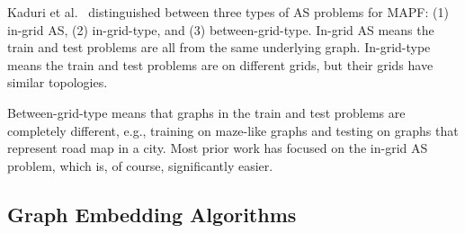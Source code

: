 \documentclass[letterpaper]{article} %
\newcommand{\Carmel}[1]{}
\newcommand{\Roni}[1]{}
\begin{document}


Kaduri et al.~\cite{kaduri2021experimental} distinguished between three types of AS problems for MAPF: 
(1) in-grid AS, (2) in-grid-type, and (3) between-grid-type. 
In-grid AS means the train and test problems are all from the same underlying graph. 
In-grid-type means the train and test problems are on different grids, but their grids have similar topologies. 
\Carmel{more accurate - In-grid-type means the train and test problems are from the same grid types but totally different maps}
\Roni{I rephrased}
Between-grid-type means that graphs in the train and test problems are completely different, e.g., training on maze-like graphs and testing on graphs that represent road map in a city. Most prior work has focused on the in-grid AS problem, which is, of course, significantly easier. 










\subsection{Graph Embedding Algorithms}
\end{document}
